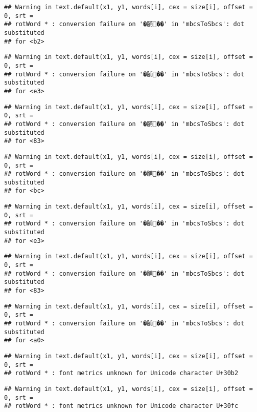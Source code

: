 \documentclass[]{article}
\begin{document}
\begin{verbatim}
## Warning in text.default(x1, y1, words[i], cex = size[i], offset = 0, srt =
## rotWord * : conversion failure on '�脯��' in 'mbcsToSbcs': dot substituted
## for <b2>
\end{verbatim}

\begin{verbatim}
## Warning in text.default(x1, y1, words[i], cex = size[i], offset = 0, srt =
## rotWord * : conversion failure on '�脯��' in 'mbcsToSbcs': dot substituted
## for <e3>
\end{verbatim}

\begin{verbatim}
## Warning in text.default(x1, y1, words[i], cex = size[i], offset = 0, srt =
## rotWord * : conversion failure on '�脯��' in 'mbcsToSbcs': dot substituted
## for <83>
\end{verbatim}

\begin{verbatim}
## Warning in text.default(x1, y1, words[i], cex = size[i], offset = 0, srt =
## rotWord * : conversion failure on '�脯��' in 'mbcsToSbcs': dot substituted
## for <bc>
\end{verbatim}

\begin{verbatim}
## Warning in text.default(x1, y1, words[i], cex = size[i], offset = 0, srt =
## rotWord * : conversion failure on '�脯��' in 'mbcsToSbcs': dot substituted
## for <e3>
\end{verbatim}

\begin{verbatim}
## Warning in text.default(x1, y1, words[i], cex = size[i], offset = 0, srt =
## rotWord * : conversion failure on '�脯��' in 'mbcsToSbcs': dot substituted
## for <83>
\end{verbatim}

\begin{verbatim}
## Warning in text.default(x1, y1, words[i], cex = size[i], offset = 0, srt =
## rotWord * : conversion failure on '�脯��' in 'mbcsToSbcs': dot substituted
## for <a0>
\end{verbatim}

\begin{verbatim}
## Warning in text.default(x1, y1, words[i], cex = size[i], offset = 0, srt =
## rotWord * : font metrics unknown for Unicode character U+30b2
\end{verbatim}

\begin{verbatim}
## Warning in text.default(x1, y1, words[i], cex = size[i], offset = 0, srt =
## rotWord * : font metrics unknown for Unicode character U+30fc
\end{verbatim}
\end{document}
